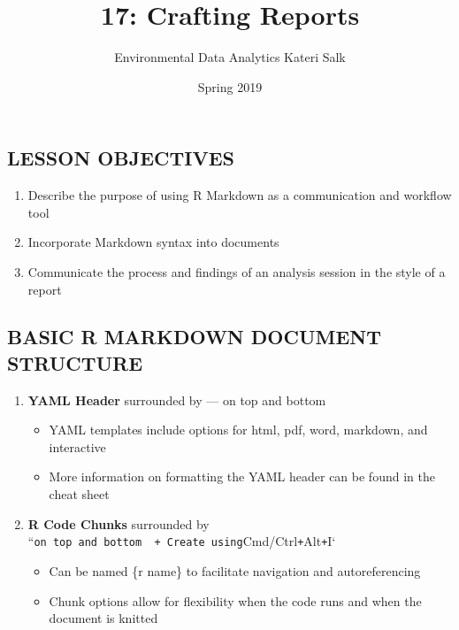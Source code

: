 \documentclass[]{article}
\title{17: Crafting Reports}
\author{Environmental Data Analytics \textbar{} Kateri Salk}
\date{Spring 2019}
\providecommand{\tightlist}{%
  \setlength{\itemsep}{0pt}\setlength{\parskip}{0pt}}
\begin{document}
\maketitle

\hypertarget{lesson-objectives}{%
\subsection{LESSON OBJECTIVES}\label{lesson-objectives}}

\begin{enumerate}
\def\labelenumi{\arabic{enumi}.}
\tightlist
\item
  Describe the purpose of using R Markdown as a communication and
  workflow tool
\item
  Incorporate Markdown syntax into documents
\item
  Communicate the process and findings of an analysis session in the
  style of a report
\end{enumerate}

\hypertarget{basic-r-markdown-document-structure}{%
\subsection{BASIC R MARKDOWN DOCUMENT
STRUCTURE}\label{basic-r-markdown-document-structure}}

\begin{enumerate}
\def\labelenumi{\arabic{enumi}.}
\tightlist
\item
  \textbf{YAML Header} surrounded by --- on top and bottom

  \begin{itemize}
  \tightlist
  \item
    YAML templates include options for html, pdf, word, markdown, and
    interactive
  \item
    More information on formatting the YAML header can be found in the
    cheat sheet
  \end{itemize}
\item
  \textbf{R Code Chunks} surrounded by
  ``\texttt{on\ top\ and\ bottom\ \ +\ Create\ using}Cmd/Ctrl\texttt{+}Alt\texttt{+}I`

  \begin{itemize}
  \tightlist
  \item
    Can be named \{r name\} to facilitate navigation and autoreferencing
  \item
    Chunk options allow for flexibility when the code runs and when the
    document is knitted
  \end{itemize}
\end{enumerate}
\end{document}
